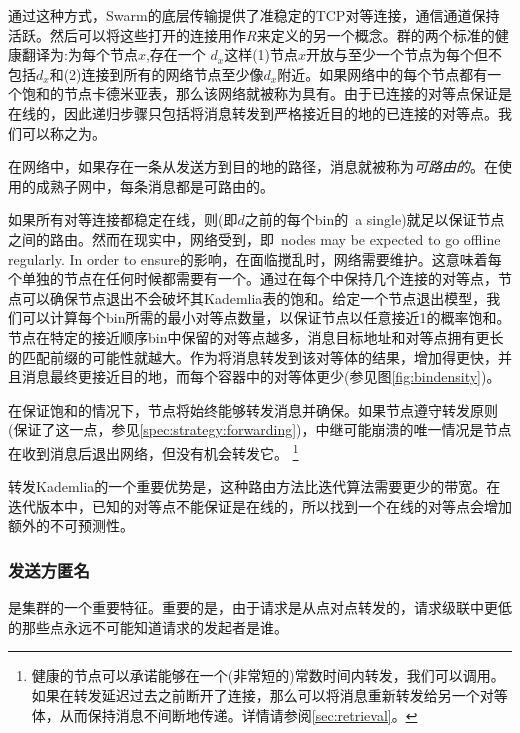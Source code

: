 通过这种方式，Swarm的底层传输提供了准稳定的TCP对等连接，通信通道保持活跃。然后可以将这些打开的连接用作$R$来定义的另一个概念。群的两个标准的健康翻译为:为每个节点$x$,存在一个 $d_x$这样(1)节点$x$开放与至少一个节点为每个但不包括$d_x$和(2)连接到所有的网络节点至少像$d_x$附近。如果网络中的每个节点都有一个饱和的节点卡德米亚表，那么该网络就被称为具有。由于已连接的对等点保证是在线的，因此递归步骤只包括将消息转发到严格接近目的地的已连接的对等点。我们可以称之为。


在网络中，如果存在一条从发送方到目的地的路径，消息就被称为\emph{可路由的}。在使用的成熟子网中，每条消息都是可路由的。

如果所有对等连接都稳定在线，则(即$d$之前的每个bin的\ a single)就足以保证节点之间的路由。然而在现实中，网络受到，即\ nodes may be expected to go offline regularly. In order to ensure的影响，在面临搅乱时，网络需要维护。这意味着每个单独的节点在任何时候都需要有一个。通过在每个中保持几个连接的对等点，节点可以确保节点退出不会破坏其Kademlia表的饱和。给定一个节点退出模型，我们可以计算每个bin所需的最小对等点数量，以保证节点以任意接近1的概率饱和。节点在特定的接近顺序bin中保留的对等点越多，消息目标地址和对等点拥有更长的匹配前缀的可能性就越大。作为将消息转发到该对等体的结果，增加得更快，并且消息最终更接近目的地，而每个容器中的对等体更少(参见图\ref{fig:bindensity})。



在保证饱和的情况下，节点将始终能够转发消息并确保。如果节点遵守转发原则(保证了这一点，参见\ref{spec:strategy:forwarding})，中继可能崩溃的唯一情况是节点在收到消息后退出网络，但没有机会转发它。%
%
\footnote{健康的节点可以承诺能够在一个(非常短的)常数时间内转发，我们可以调用。如果在转发延迟过去之前断开了连接，那么可以将消息重新转发给另一个对等体，从而保持消息不间断地传递。详情请参阅\ref{sec:retrieval}。
} 

转发Kademlia的一个重要优势是，这种路由方法比迭代算法需要更少的带宽。在迭代版本中，已知的对等点不能保证是在线的，所以找到一个在线的对等点会增加额外的不可预测性。

\subsubsection{发送方匿名}
是集群的一个重要特征。重要的是，由于请求是从点对点转发的，请求级联中更低的那些点永远不可能知道请求的发起者是谁。

